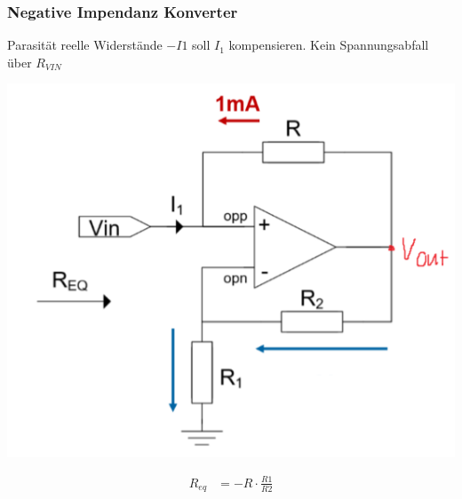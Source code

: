 \subsubsection{Negative Impendanz Konverter}
Parasität reelle Widerstände $-I1$ soll $I_1$ kompensieren. Kein Spannungsabfall über $R_{VIN}$\\
\begin{minipage}{0.20\textwidth}
	\includegraphics[width=\linewidth,keepaspectratio=true]{./Images/opamp_nic}
\end{minipage}%
\begin{minipage}{0.30\textwidth}
	\begin{align*}
		R_{eq} &= -R\cdot \frac{R1}{R2}
	\end{align*}
\end{minipage}


